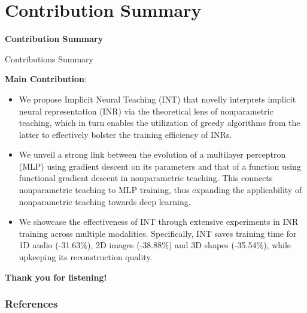 \documentclass[aspectratio=169,xcolor=dvipsnames]{beamer}
\begin{document}
\section{Contribution Summary}
\begin{frame}
    \LARGE{\centerline{\textbf{Contribution Summary}}}
\end{frame}
\begin{frame}{Contributions Summary}

{\bf \color{blue} Main Contribution}: 
\begin{itemize}
\setlength\itemsep{0.1em}
\item We propose \alert{Implicit Neural Teaching} (INT) that novelly interprets \alert{implicit neural representation} (INR) via the theoretical lens of \alert{nonparametric teaching}, which in turn enables the utilization of greedy algorithms from the latter to effectively \alert{bolster the training efficiency} of INRs.
\item We unveil a strong \alert{link} between the evolution of a \alert{multilayer perceptron} (MLP) using gradient descent on its parameters and that of a function using functional gradient descent in \alert{nonparametric teaching}. This connects nonparametric teaching to MLP training, thus expanding the \alert{applicability} of nonparametric teaching towards deep learning. %
\item We showcase the \alert{effectiveness} of INT through extensive experiments in INR training across multiple modalities. Specifically, INT saves training time  for 1D audio (-31.63\%), 2D images (-38.88\%) and 3D shapes (-35.54\%), while upkeeping its reconstruction quality.
\end{itemize}
\end{frame}

\begin{frame}
    \Huge{\centerline{\textbf{Thank you for listening!}}}
\end{frame}

\begin{frame}[allowframebreaks]
    \frametitle{References}
    
    {\footnotesize }
\end{frame}
\end{document}
